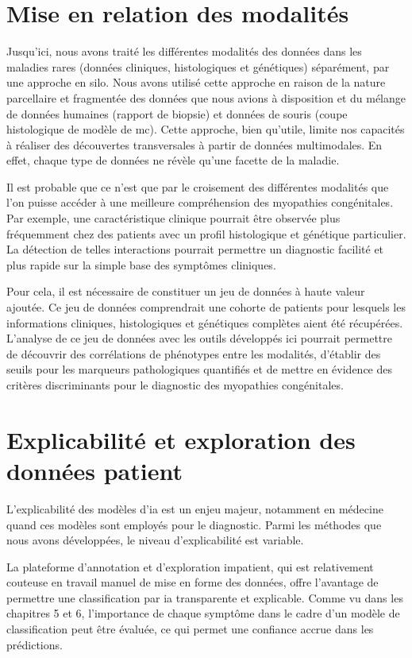 \section{Mise en relation des modalités}
Jusqu’ici, nous avons traité les différentes modalités des données dans les maladies rares (données cliniques, histologiques et génétiques) séparément, par une approche en silo. Nous avons utilisé cette approche en raison de la nature parcellaire et fragmentée des données que nous avions à disposition et du mélange de données humaines (rapport de biopsie) et données de souris (coupe histologique de modèle de \gls{mc}). Cette approche, bien qu'utile, limite nos capacités à réaliser des découvertes transversales à partir de données multimodales. En effet, chaque type de données ne révèle qu'une facette de la maladie. 

Il est probable que ce n'est que par le croisement des différentes modalités que l'on puisse accéder à une meilleure compréhension des myopathies congénitales. Par exemple, une caractéristique clinique pourrait être observée plus fréquemment chez des patients avec un profil histologique et génétique particulier. La détection de telles interactions pourrait permettre un diagnostic facilité et plus rapide sur la simple base des symptômes cliniques.

Pour cela, il est nécessaire de constituer un jeu de données à haute valeur ajoutée. Ce jeu de données comprendrait une cohorte de patients pour lesquels les informations cliniques, histologiques et génétiques complètes aient été récupérées. L'analyse de ce jeu de données avec les outils développés ici pourrait permettre de découvrir des corrélations de phénotypes entre les modalités, d'établir des seuils pour les marqueurs pathologiques quantifiés et de mettre en évidence des critères discriminants pour le diagnostic des myopathies congénitales.

\section{Explicabilité et exploration des données patient}
L'explicabilité des modèles d'\gls{ia} est un enjeu majeur, notamment en médecine quand ces modèles sont employés pour le diagnostic. Parmi les méthodes que nous avons développées, le niveau d'explicabilité est variable.

La plateforme d'annotation et d'exploration \gls{impatient}, qui est relativement couteuse en travail manuel de mise en forme des données, offre l'avantage de permettre une classification par \gls{ia} transparente et explicable. Comme vu dans les chapitres 5 et 6, l'importance de chaque symptôme dans le cadre d'un modèle de classification peut être évaluée, ce qui permet une confiance accrue dans les prédictions.

